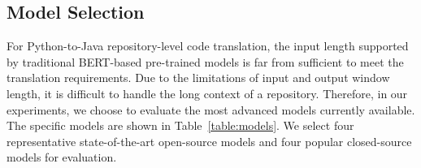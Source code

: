 

\subsection{Model Selection}

For Python-to-Java repository-level code translation, the input length supported by traditional BERT-based pre-trained models is far from sufficient to meet the translation requirements. Due to the limitations of input and output window length, it is difficult to handle the long context of a repository. Therefore, in our experiments, we choose to evaluate the most advanced models currently available. The specific models are shown in Table~\ref{table:models}. We select four representative state-of-the-art open-source models and four popular closed-source models for evaluation.


